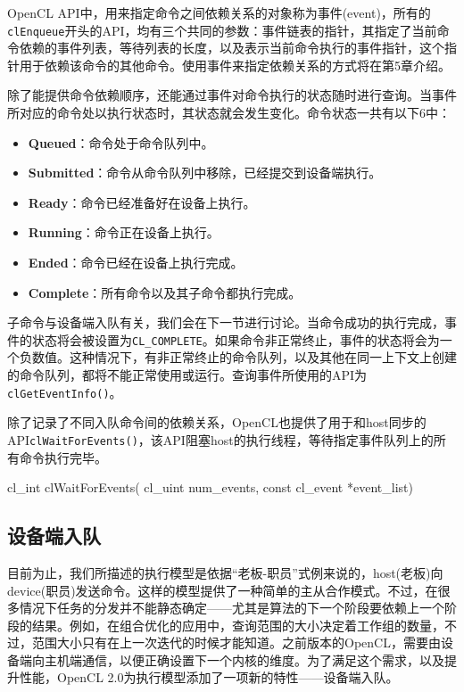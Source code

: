 OpenCL API中，用来指定命令之间依赖关系的对象称为事件(event)，所有的\texttt{clEnqueue}开头的API，均有三个共同的参数：事件链表的指针，其指定了当前命令依赖的事件列表，等待列表的长度，以及表示当前命令执行的事件指针，这个指针用于依赖该命令的其他命令。使用事件来指定依赖关系的方式将在第5章介绍。

除了能提供命令依赖顺序，还能通过事件对命令执行的状态随时进行查询。当事件所对应的命令处以执行状态时，其状态就会发生变化。命令状态一共有以下6中：

\begin{itemize}
\item \textbf{Queued}：命令处于命令队列中。
\item \textbf{Submitted}：命令从命令队列中移除，已经提交到设备端执行。
\item \textbf{Ready}：命令已经准备好在设备上执行。
\item \textbf{Running}：命令正在设备上执行。
\item \textbf{Ended}：命令已经在设备上执行完成。
\item \textbf{Complete}：所有命令以及其子命令都执行完成。
\end{itemize}

子命令与设备端入队有关，我们会在下一节进行讨论。当命令成功的执行完成，事件的状态将会被设置为\texttt{CL\_COMPLETE}。如果命令非正常终止，事件的状态将会为一个负数值。这种情况下，有非正常终止的命令队列，以及其他在同一上下文上创建的命令队列，都将不能正常使用或运行。查询事件所使用的API为\texttt{clGetEventInfo()}。

除了记录了不同入队命令间的依赖关系，OpenCL也提供了用于和host同步的API\texttt{clWaitForEvents()}，该API阻塞host的执行线程，等待指定事件队列上的所有命令执行完毕。

\begin{codebox}[cpp]
cl_int
clWaitForEvents(
  cl_uint num_events,
  const cl_event *event_list)
\end{codebox}

\subsection{设备端入队}

目前为止，我们所描述的执行模型是依据“老板-职员”式例来说的，host(老板)向device(职员)发送命令。这样的模型提供了一种简单的主从合作模式。不过，在很多情况下任务的分发并不能静态确定——尤其是算法的下一个阶段要依赖上一个阶段的结果。例如，在组合优化的应用中，查询范围的大小决定着工作组的数量，不过，范围大小只有在上一次迭代的时候才能知道。之前版本的OpenCL，需要由设备端向主机端通信，以便正确设置下一个内核的维度。为了满足这个需求，以及提升性能，OpenCL 2.0为执行模型添加了一项新的特性——设备端入队。

